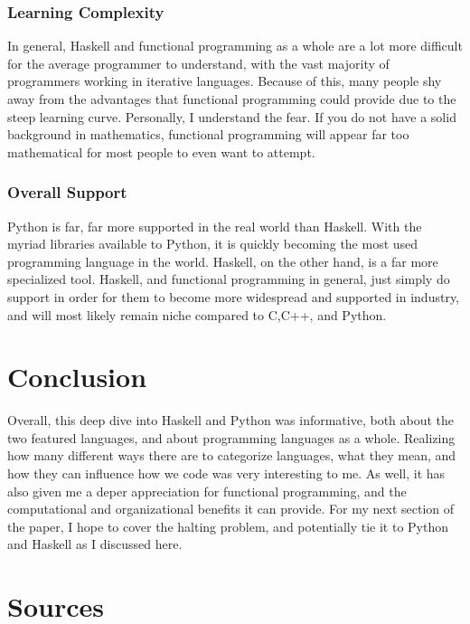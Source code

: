 \documentclass{article}
\begin{document}
        \subsubsection{Learning Complexity}
        In general, Haskell and functional programming as a whole are a lot more difficult for the average programmer to understand, with the vast majority of programmers working in iterative languages. Because of this, many people shy away from the advantages that functional programming could provide due to the steep learning curve. Personally, I understand the fear. If you do not have a solid background in mathematics, functional programming will appear far too mathematical for most people to even want to attempt. 
        \subsubsection{Overall Support}
        Python is far, far more supported in the real world than Haskell. With the myriad libraries available to Python, it is quickly becoming the most used programming language in the world. Haskell, on the other hand, is a far more specialized tool. Haskell, and functional programming in general, just simply do support in order for them to become more widespread and supported in industry, and will most likely remain niche compared to C,C++, and Python. 
        
\section {Conclusion}
Overall, this deep dive into Haskell and Python was informative, both about the two featured languages, and about programming languages as a whole. Realizing how many different ways there are to categorize languages, what they mean, and how they can influence how we code was very interesting to me. As well, it has also given me a deper appreciation for functional programming, and the computational and organizational benefits it can provide. For my next section of the paper, I hope to cover the halting problem, and potentially tie it to Python and Haskell as I discussed here. 

\medskip\noindent 

\section{Sources}
\end{document}
